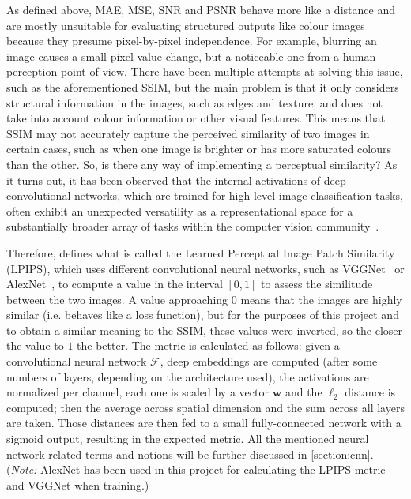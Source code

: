 As defined above, MAE, MSE, SNR and PSNR behave more like a distance and are mostly unsuitable for evaluating structured outputs like colour images because they presume pixel-by-pixel independence. For example, blurring an image causes a small pixel value change, but a noticeable one from a human perception point of view. There have been multiple attempts at solving this issue, such as the aforementioned SSIM, but the main problem is that it only considers structural information in the images, such as edges and texture, and does not take into account colour information or other visual features. This means that SSIM may not accurately capture the perceived similarity of two images in certain cases, such as when one image is brighter or has more saturated colours than the other. So, is there any way of implementing a perceptual similarity? As it turns out, it has been observed that the internal activations of deep convolutional networks, which are trained for high-level image classification tasks, often exhibit an unexpected versatility as a representational space for a substantially broader array of tasks within the computer vision community~\supercite{lpips}.

Therefore, \cite{lpips} defines what is called the Learned Perceptual Image Patch Similarity (LPIPS), which uses different convolutional neural networks, such as VGGNet~\supercite{vgg} or AlexNet~\supercite{alexnet}, to compute a value in the interval $[0, 1]$ to assess the similitude between the two images. A value approaching $0$ means that the images are highly similar (i.e. behaves like a loss function), but for the purposes of this project and to obtain a similar meaning to the SSIM, these values were inverted, so the closer the value to $1$ the better. The metric is calculated as follows: given a convolutional neural network $\mathcal{F}$, deep embeddings are computed (after some numbers of layers, depending on the architecture used), the activations are normalized per channel, each one is scaled by a vector $\symbf{w}$ and the $\ell_2$ distance is computed; then the average across spatial dimension and the sum across all layers are taken. Those distances are then fed to a small fully-connected network with a sigmoid output, resulting in the expected metric. All the mentioned neural network-related terms and notions will be further discussed in \autoref{section:cnn}. (\textit{Note:} AlexNet has been used in this project for calculating the LPIPS metric and VGGNet when training.)

\label{section:nn}

